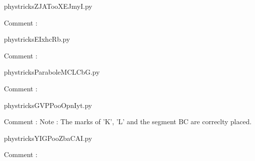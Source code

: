 
    \newcommand{\CaptionFigZJATooXEJmyI}{<+Type your caption here+>}
    \begin{center}
        
    \end{center}
    phystricksZJATooXEJmyI.py

    Comment : 

    \clearpage
    


    \newcommand{\CaptionFigEIxhcRb}{<+Type your caption here+>}
    \begin{center}
        
    \end{center}
    phystricksEIxhcRb.py

    Comment : 

    \clearpage
    


    \newcommand{\CaptionFigParaboleMCLCbG}{<+Type your caption here+>}
    \begin{center}
        
    \end{center}
    phystricksParaboleMCLCbG.py

    Comment : 

    \clearpage
    


    \newcommand{\CaptionFigGVPPooOpnIyt}{<+Type your caption here+>}
    \begin{center}
        
    \end{center}
    phystricksGVPPooOpnIyt.py

    Comment : Note : The marks of 'K', 'L' and the segment BC are correclty placed.

    \clearpage
    


    \newcommand{\CaptionFigYIGPooZbaCAI}{<+Type your caption here+>}
    \begin{center}
        
    \end{center}
    phystricksYIGPooZbaCAI.py

    Comment : 

    \clearpage
    


